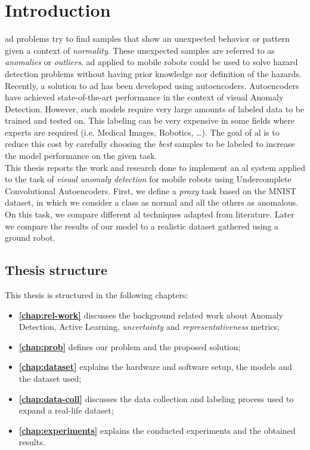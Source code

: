 \chapter{Introduction}

     \acrfull{ad} problems try to find samples that show an unexpected behavior or pattern given a context of \emph{normality}. These unexpected samples are referred to as \emph{anomalies} or \emph{outliers}.
    \acrshort{ad} applied to mobile robots could be used to solve hazard detection problems without having prior knowledge nor definition of the hazards.
    \\
    
    Recently, a solution \cite{wellhausen2020safe, mantegazza2022outlier} to \acrshort{ad} has been developed using autoencoders. Autoencoders have achieved state-of-the-art performance in the context of visual Anomaly Detection. However, such models require very large amounts of labeled data to be trained and tested on. This labeling can be very expensive in some fields where experts are required (i.e. Medical Images, Robotics, \dots). The goal of \acrfull{al} is to reduce this cost by carefully choosing the \emph{best} samples to be labeled to increase the model performance on the given task.
    \\
    
    This thesis reports the work and research done to implement an \acrshort{al} system applied to the task of \emph{visual anomaly detection} for mobile robots using Undercomplete Convolutional Autoencoders.
    First, we define a \emph{proxy} task based on the MNIST dataset, in which we consider a class as normal and all the others as anomalous. On this task, we compare different \acrshort{al} techniques adapted from literature. Later we compare the results of our model to a realistic dataset gathered using a ground robot.

\newpage
\section*{Thesis structure}
This thesis is structured in the following chapters:

\begin{itemize}
    \item \textbf{\autoref{chap:rel-work}} discusses the background related work about Anomaly Detection, Active Learning, \emph{uncertainty} and \emph{representativeness} metrics;
    \item \textbf{\autoref{chap:prob}} defines our problem and the proposed solution;
    \item \textbf{\autoref{chap:dataset}} explains the hardware and software setup, the models and the dataset used;
    \item \textbf{\autoref{chap:data-coll}} discusses the data collection and labeling process used to expand a real-life dataset;
    \item \textbf{\autoref{chap:experiments}} explains the conducted experiments and the obtained results.
\end{itemize}

